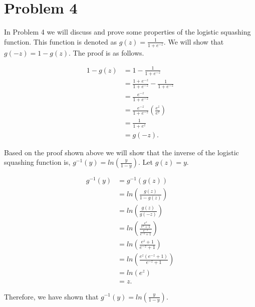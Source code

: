 \documentclass[paper=a4, fontsize=11pt]{scrartcl} %
\begin{document}
\section{Problem 4}

In Problem 4 we will discuss and prove some properties of the logistic squashing function.
This function is denoted as $g(z) = \frac{1}{1 + e^{-z}}$.  We will show that $g(-z) = 1 - g(z)$.  The proof is as follows.

\begin{align*}
1-g(z) &= 1- \frac{1}{1 + e^{-z}} \\
&= \frac{1 + e^{-z}}{1 + e^{-z}}- \frac{1}{1 + e^{-z}} \\
&= \frac{e^{-z}}{1 + e^{-z}} \\
&= \frac{e^{-z}}{1 + e^{-z}}(\frac{e^{z}}{e^{z}}) \\
&= \frac{1}{1 + e^{z}} \\
&= g(-z).
\end{align*}

Based on the proof shown above we will show that the inverse of the logistic squashing function is, $g^{-1}(y) = ln(\frac{y}{1-y})$.  Let $g(z) = y$.

\begin{align*}
g^{-1}(y) &= g^{-1}(g(z)) \\
&= ln(\frac{g(z)}{1-g(z)}) \\
&= ln(\frac{g(z)}{g(-z)}) \\
&= ln(\frac{\frac{e^{z}}{e^{z}+1}}{\frac{e^{-z}}{e^{-z}+1}}) \\
&= ln(\frac{e^z + 1}{e^{-z} + 1})\\
&= ln(\frac{e^{z}(e^{-z}+1)}{e^{-z}+1})\\
&= ln(e^{z})\\
&= z.
\end{align*}

Therefore, we have shown that $g^{-1}(y) = ln(\frac{y}{1-y})$.
\end{document}
